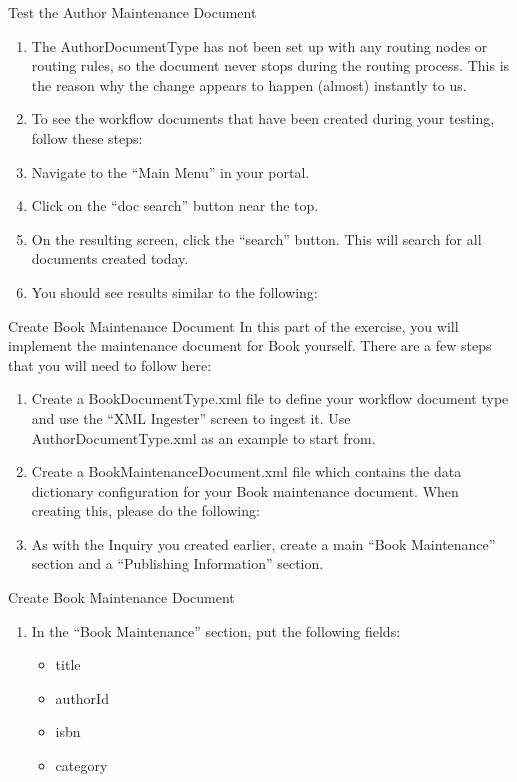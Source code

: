 \documentclass[xcolor=dvipsnames,14pt,professionalfonts]{beamer}
\begin{document}
\begin{frame}{Test the Author Maintenance Document}
  \begin{enumerate}
  \item The AuthorDocumentType has not been set up with any routing nodes or routing rules, so the document never stops during the routing process.  This is the reason why the change appears to happen (almost) instantly to us.
  \item To see the workflow documents that have been created during your testing, follow these steps:
  \item Navigate to the “Main Menu” in your portal.
  \item Click on the “doc search” button near the top.
  \item On the resulting screen, click the “search” button.  This will search for all documents created today.
  \item You should see results similar to the following:
  \end{enumerate}
\end{frame}

 \begin{frame}{Create Book Maintenance Document}
In this part of the exercise, you will implement the maintenance document for Book yourself.
There are a few steps that you will need to follow here: 
 \begin{enumerate}
 \item Create a BookDocumentType.xml file to define your workflow document type and use the “XML Ingester” screen to ingest it.  Use AuthorDocumentType.xml as an example to start from.
 \item Create a BookMaintenanceDocument.xml file which contains the data dictionary configuration for your Book maintenance document.  When creating this, please do the following:
   \item As with the Inquiry you created earlier, create a main “Book Maintenance” section and a “Publishing Information” section.
  \end{enumerate}
\end{frame}
 
\begin{frame}{Create Book Maintenance Document}
  \begin{enumerate}
    \item In the “Book Maintenance” section, put the following fields:
      \begin{itemize}
      \item title
      \item authorId
      \item isbn
      \item category
\end{itemize}
  \end{enumerate}
\end{frame}
\end{document}
